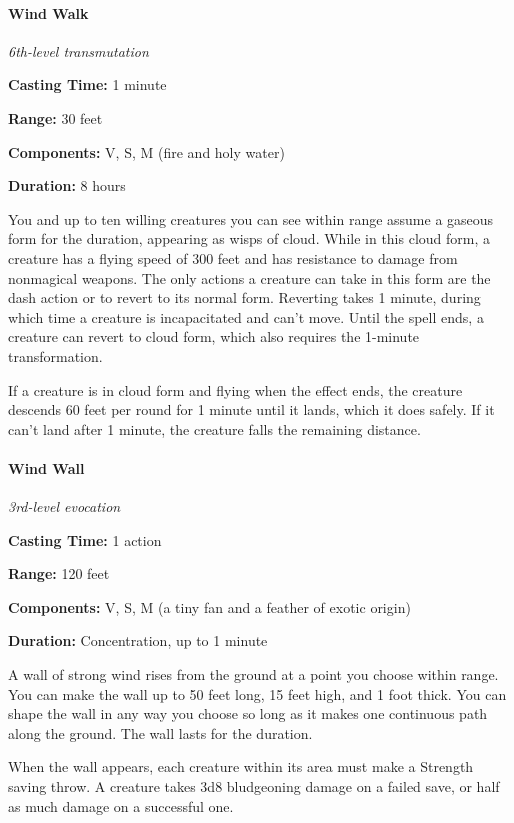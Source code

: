 \documentclass[
]{article}
\begin{document}
\hypertarget{wind-walk}{%
\paragraph{Wind Walk}\label{wind-walk}}

\emph{6th-level transmutation}

\textbf{Casting Time:} 1 minute

\textbf{Range:} 30 feet

\textbf{Components:} V, S, M (fire and holy water)

\textbf{Duration:} 8 hours

You and up to ten willing creatures you can see within range assume a
gaseous form for the duration, appearing as wisps of cloud. While in
this cloud form, a creature has a flying speed of 300 feet and has
resistance to damage from nonmagical weapons. The only actions a
creature can take in this form are the dash action or to revert to its
normal form. Reverting takes 1 minute, during which time a creature is
incapacitated and can't move. Until the spell ends, a creature can
revert to cloud form, which also requires the 1-minute transformation.

If a creature is in cloud form and flying when the effect ends, the
creature descends 60 feet per round for 1 minute until it lands, which
it does safely. If it can't land after 1 minute, the creature falls the
remaining distance.

\hypertarget{wind-wall}{%
\paragraph{Wind Wall}\label{wind-wall}}

\emph{3rd-level evocation}

\textbf{Casting Time:} 1 action

\textbf{Range:} 120 feet

\textbf{Components:} V, S, M (a tiny fan and a feather of exotic origin)

\textbf{Duration:} Concentration, up to 1 minute

A wall of strong wind rises from the ground at a point you choose within
range. You can make the wall up to 50 feet long, 15 feet high, and 1
foot thick. You can shape the wall in any way you choose so long as it
makes one continuous path along the ground. The wall lasts for the
duration.

When the wall appears, each creature within its area must make a
Strength saving throw. A creature takes 3d8 bludgeoning damage on a
failed save, or half as much damage on a successful one.
\end{document}
